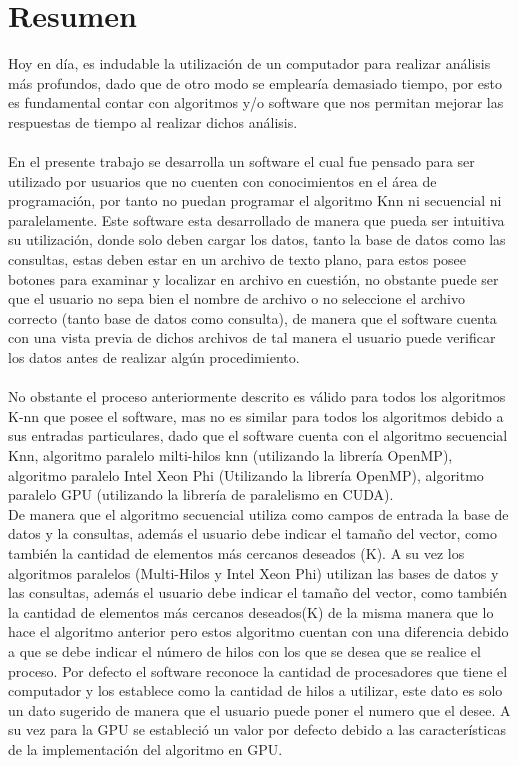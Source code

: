 \section*{Resumen}
Hoy en día, es indudable la utilización de un computador para realizar análisis más profundos, dado que de otro modo se emplearía demasiado tiempo, por esto es fundamental contar con algoritmos y/o software que nos permitan mejorar las respuestas de tiempo al realizar dichos análisis.
\\\\
En el presente trabajo se desarrolla un software el cual fue pensado para ser utilizado por usuarios que no cuenten con conocimientos en el área de programación, por tanto no puedan programar el algoritmo Knn ni secuencial ni paralelamente. Este software esta desarrollado de manera que pueda ser intuitiva su utilización, donde solo deben cargar los datos, tanto la base de datos como las consultas, estas deben estar en un archivo de texto plano, para estos posee botones para examinar y localizar en archivo en cuestión, no obstante puede ser que el usuario no sepa bien el nombre de archivo o no seleccione el archivo correcto (tanto base de datos como consulta), de manera que el software cuenta con una vista previa de dichos archivos de tal manera el usuario puede verificar los datos antes de realizar algún procedimiento.\\\\

No obstante el proceso anteriormente descrito es válido para todos los algoritmos K-nn que posee el software, mas no es similar para todos los algoritmos debido a sus entradas particulares, dado que el software cuenta con el algoritmo secuencial Knn, algoritmo paralelo milti-hilos knn (utilizando la librería OpenMP), algoritmo paralelo Intel Xeon Phi (Utilizando la librería OpenMP), algoritmo paralelo GPU (utilizando la librería de paralelismo en CUDA).\\
De manera que el algoritmo secuencial utiliza como campos de entrada la base de datos y la consultas, además el usuario debe indicar el tamaño del vector, como también la cantidad de elementos más cercanos deseados (K). A su vez los algoritmos paralelos (Multi-Hilos y Intel Xeon Phi) utilizan las bases de datos y las consultas, además el usuario debe indicar el tamaño del vector, como también la cantidad de elementos más cercanos deseados(K) de la misma manera que lo hace el algoritmo anterior pero estos algoritmo cuentan con una diferencia debido a que se debe indicar el número de hilos con los que se desea que se realice el proceso. Por defecto el software reconoce la cantidad de procesadores que tiene el computador y los establece como la cantidad de hilos a utilizar, este dato es solo un dato sugerido de manera que el usuario puede poner el numero que el desee. A su vez para la GPU se estableció un valor por defecto debido a las características de la implementación del algoritmo en GPU.\\\\

